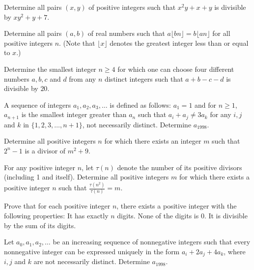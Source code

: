
\item[\textbf{N1.}]Determine all pairs $(x,y)$ of positive integers such that $x^{2}y+x+y$ is divisible by $xy^{2}+y+7$.

\item[\textbf{N2.}]Determine all pairs $(a,b)$ of real numbers such that $a \lfloor bn \rfloor =b \lfloor an \rfloor $ for all positive integers $n$. (Note that $\lfloor x\rfloor $ denotes the greatest integer less than or equal to $x$.)

\item[\textbf{N3.}]Determine the smallest integer $n\geq 4$ for which one can choose four different numbers $a,b,c$ and $d$ from any $n$ distinct integers such that $a+b-c-d$ is divisible by $20$.

\item[\textbf{N4.}]A sequence of integers $ a_{1},a_{2},a_{3},\ldots$ is defined as follows: $ a_{1} = 1$ and for $ n\geq 1$,  $ a_{n + 1}$ is the smallest integer greater than $ a_{n}$ such that $ a_{i} + a_{j}\neq 3a_{k}$ for any $ i,j$ and $ k$ in $ \{1,2,3,\ldots ,n + 1\}$,  not necessarily distinct. Determine $ a_{1998}$.

\item[\textbf{N5.}]Determine all positive integers $n$ for which there exists an integer $m$ such that ${2^{n}-1}$ is a divisor of ${m^{2}+9}$.

\item[\textbf{N6.}]For any positive integer $n$,  let $\tau (n)$ denote the number of its positive divisors (including 1 and itself). Determine all positive integers $m$ for which there exists a positive integer $n$ such that $\frac{\tau (n^{2})}{\tau (n)}=m$.

\item[\textbf{N7.}]Prove that for each positive integer $n$,  there exists a positive integer with the following properties: It has exactly $n$ digits. None of the digits is 0. It is divisible by the sum of its digits.

\item[\textbf{N8.}]Let $a_{0},a_{1},a_{2},\ldots $ be an increasing sequence of nonnegative integers such that every nonnegative integer can be expressed uniquely in the form $a_{i}+2a_{j}+4a_{k}$,  where $i,j$ and $k$ are not necessarily distinct. Determine $a_{1998}$.

